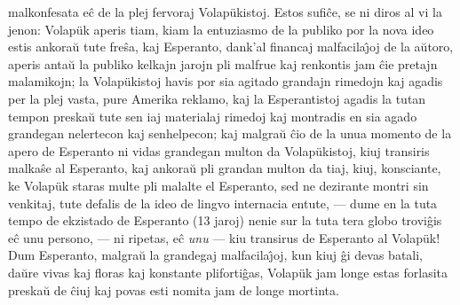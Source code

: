 malkonfesata e\^c de la plej fervoraj Volap\"ukistoj. Estos
sufi\^ce, se ni diros al vi la jenon: Volap\"uk aperis tiam, kiam la
entuziasmo de la publiko por la nova ideo estis ankora\u u tute
fre\^sa, kaj Esperanto, dank'al financaj malfacila\^{\j}oj de la a\u
utoro, aperis anta\u u la publiko kelkajn jarojn pli malfrue kaj
renkontis jam \^cie pretajn malamikojn; la Volap\"ukistoj havis por
sia agitado grandajn rimedojn kaj agadis per la plej vasta, pure
Amerika reklamo, kaj la Esperantistoj agadis la tutan tempon
preska\u u tute sen iaj materialaj rimedoj kaj montradis en sia
agado grandegan nelertecon kaj senhelpecon; kaj malgra\u u \^cio de
la unua momento de la apero de Esperanto ni vidas grandegan multon
da Volap\"ukistoj, kiuj transiris malka\^se al Esperanto, kaj
ankora\u u pli grandan multon da tiaj, kiuj, konsciante, ke
Volap\"uk staras multe pli malalte el Esperanto, sed ne dezirante
montri sin venkitaj, tute defalis de la ideo de lingvo internacia
entute,
--- dume en la tuta tempo de ekzistado de Esperanto (13 jaroj) nenie
sur la tuta tera globo trovi\^gis e\^c unu persono, --- ni ripetas,
e\^c {\sl unu} --- kiu transirus de Esperanto al Volap\"uk! Dum
Esperanto, malgra\u u la grandegaj malfacila\^{\j}oj, kun kiuj \^gi
devas batali, da\u ure vivas kaj floras kaj konstante pliforti\^gas,
Volap\"uk jam longe estas forlasita preska\u u de \^ciuj kaj povas
esti nomita jam de longe mortinta.

